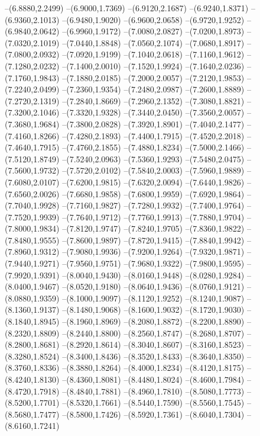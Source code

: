 {\begin{scope}
--(6.8880,2.2499)
--(6.9000,1.7369)
--(6.9120,2.1687)
--(6.9240,1.8371)
--(6.9360,2.1013)
--(6.9480,1.9020)
--(6.9600,2.0658)
--(6.9720,1.9252)
--(6.9840,2.0642)
--(6.9960,1.9172)
--(7.0080,2.0827)
--(7.0200,1.8973)
--(7.0320,2.1019)
--(7.0440,1.8848)
--(7.0560,2.1074)
--(7.0680,1.8917)
--(7.0800,2.0932)
--(7.0920,1.9199)
--(7.1040,2.0618)
--(7.1160,1.9612)
--(7.1280,2.0232)
--(7.1400,2.0010)
--(7.1520,1.9924)
--(7.1640,2.0236)
--(7.1760,1.9843)
--(7.1880,2.0185)
--(7.2000,2.0057)
--(7.2120,1.9853)
--(7.2240,2.0499)
--(7.2360,1.9354)
--(7.2480,2.0987)
--(7.2600,1.8889)
--(7.2720,2.1319)
--(7.2840,1.8669)
--(7.2960,2.1352)
--(7.3080,1.8821)
--(7.3200,2.1046)
--(7.3320,1.9328)
--(7.3440,2.0450)
--(7.3560,2.0057)
--(7.3680,1.9684)
--(7.3800,2.0828)
--(7.3920,1.8901)
--(7.4040,2.1477)
--(7.4160,1.8266)
--(7.4280,2.1893)
--(7.4400,1.7915)
--(7.4520,2.2018)
--(7.4640,1.7915)
--(7.4760,2.1855)
--(7.4880,1.8234)
--(7.5000,2.1466)
--(7.5120,1.8749)
--(7.5240,2.0963)
--(7.5360,1.9293)
--(7.5480,2.0475)
--(7.5600,1.9732)
--(7.5720,2.0102)
--(7.5840,2.0003)
--(7.5960,1.9889)
--(7.6080,2.0107)
--(7.6200,1.9815)
--(7.6320,2.0094)
--(7.6440,1.9826)
--(7.6560,2.0026)
--(7.6680,1.9858)
--(7.6800,1.9959)
--(7.6920,1.9864)
--(7.7040,1.9928)
--(7.7160,1.9827)
--(7.7280,1.9932)
--(7.7400,1.9764)
--(7.7520,1.9939)
--(7.7640,1.9712)
--(7.7760,1.9913)
--(7.7880,1.9704)
--(7.8000,1.9834)
--(7.8120,1.9747)
--(7.8240,1.9705)
--(7.8360,1.9822)
--(7.8480,1.9555)
--(7.8600,1.9897)
--(7.8720,1.9415)
--(7.8840,1.9942)
--(7.8960,1.9312)
--(7.9080,1.9936)
--(7.9200,1.9264)
--(7.9320,1.9871)
--(7.9440,1.9271)
--(7.9560,1.9751)
--(7.9680,1.9322)
--(7.9800,1.9595)
--(7.9920,1.9391)
--(8.0040,1.9430)
--(8.0160,1.9448)
--(8.0280,1.9284)
--(8.0400,1.9467)
--(8.0520,1.9180)
--(8.0640,1.9436)
--(8.0760,1.9121)
--(8.0880,1.9359)
--(8.1000,1.9097)
--(8.1120,1.9252)
--(8.1240,1.9087)
--(8.1360,1.9137)
--(8.1480,1.9068)
--(8.1600,1.9032)
--(8.1720,1.9030)
--(8.1840,1.8945)
--(8.1960,1.8969)
--(8.2080,1.8872)
--(8.2200,1.8890)
--(8.2320,1.8809)
--(8.2440,1.8800)
--(8.2560,1.8747)
--(8.2680,1.8707)
--(8.2800,1.8681)
--(8.2920,1.8614)
--(8.3040,1.8607)
--(8.3160,1.8523)
--(8.3280,1.8524)
--(8.3400,1.8436)
--(8.3520,1.8433)
--(8.3640,1.8350)
--(8.3760,1.8336)
--(8.3880,1.8264)
--(8.4000,1.8234)
--(8.4120,1.8175)
--(8.4240,1.8130)
--(8.4360,1.8081)
--(8.4480,1.8024)
--(8.4600,1.7984)
--(8.4720,1.7918)
--(8.4840,1.7881)
--(8.4960,1.7810)
--(8.5080,1.7773)
--(8.5200,1.7701)
--(8.5320,1.7661)
--(8.5440,1.7590)
--(8.5560,1.7545)
--(8.5680,1.7477)
--(8.5800,1.7426)
--(8.5920,1.7361)
--(8.6040,1.7304)
--(8.6160,1.7241)

\end{scope}}
